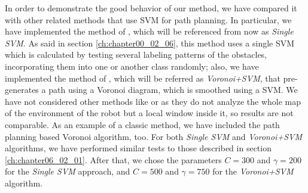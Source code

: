 In order to demonstrate the good behavior of our method, we have compared it with other related methods that use \ac{SVM} for path planning. In particular, we have implemented the method of \cite{miura2006support}, which will be referenced from now as \textit{Single \ac{SVM}}. As said in section \ref{ch:chapter00_02_06}, this method uses a single \ac{SVM} which is calculated by testing several labeling patterns of the obstacles, incorporating them into one or another class randomly; also, we have implemented the method of \cite{yang2012safe}, which will be referred as \textit{Voronoi+\ac{SVM}}, that pre-generates a path using a Voronoi diagram, which is smoothed using a \ac{SVM}. We have not considered other methods like \cite{sarkar2008mobile} or \cite{qingyang2012local} as they do not analyze the whole map of the environment of the robot but a local window inside it, so results are not comparable. As an example of a classic method, we have included the path planning based Voronoi algorithm, too.
For both \textit{Single \ac{SVM}} and \textit{Voronoi+\ac{SVM}} algorithms, we have performed similar tests to those described in section \ref{ch:chapter06_02_01}. After that, we chose the parameters $C=300$ and $\gamma=200$ for the \textit{Single \ac{SVM}} approach, and $C=500$ and $\gamma=750$ for the \textit{Voronoi+\ac{SVM}} algorithm.

